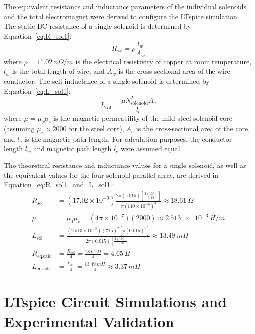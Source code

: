 The equivalent resistance and inductance parameters of the individual solenoids and the total electromagnet were derived to configure the LTspice simulation. The static DC resistance of a single solenoid is determined by Equation~\ref{eq:R_sol1}:
\begin{equation}
	\label{eq:R_sol1}
	R_{\text{sol}} = \rho \frac{l_w}{A_w}
\end{equation}
where $\rho = \SI{17.02}{n\Omega/m}$ is the electrical resistivity of copper at room temperature, $l_w$ is the total length of wire, and $A_w$ is the cross-sectional area of the wire conductor. The self-inductance of a single solenoid is determined by Equation~\ref{eq:L_sol1}:
\begin{equation}
	\label{eq:L_sol1}
	L_{\text{sol}} = \frac{\mu N_{\text{solenoid}}^2 A_c}{l_c}
\end{equation}
where $\mu = \mu_0 \mu_r$ is the magnetic permeability of the mild steel solenoid core (assuming $\mu_r \approx 2000$ for the steel core), $A_c$ is the cross-sectional area of the core, and $l_c$ is the magnetic path length. For calculation purposes, the conductor length $l_w$ and magnetic path length $l_c$ were assumed equal.

The theoretical resistance and inductance values for a single solenoid, as well as the equivalent values for the four-solenoid parallel array, are derived in Equation~\ref{eq:R_sol1_and_L_sol1}:
\begin{align}
	\label{eq:R_sol1_and_L_sol1}
	R_{\text{sol}} &= (17.02 \times 10^{-9})\frac{2\pi(0.015)\left[\frac{2(100)}{0.28}\right]}{\pi(140 \times 10^{-6})^2} \approx \SI{18.61}{\Omega} \\
	\mu &= \mu_0 \mu_r = (4\pi \times 10^{-7})(2000) \approx \SI{2.513e-3}{H/m} \\
	L_{\text{sol}} &= \frac{(2.513 \times 10^{-3})(715)^2 \left[\pi (0.015)^2\right]}{2\pi(0.015)\left[\frac{2(100)}{0.28}\right]} \approx \SI{13.49}{mH} \\
	R_{\text{eq,calc}} &= \frac{R_{\text{sol}}}{4} = \frac{\SI{18.61}{\Omega}}{4} = \SI{4.65}{\Omega} \\
	L_{\text{eq,calc}} &= \frac{L_{\text{sol}}}{4} = \frac{\SI{13.49}{mH}}{4} \approx \SI{3.37}{mH}
\end{align}

\section{LTspice Circuit Simulations and Experimental Validation}
\label{app:circuit_simulations}

